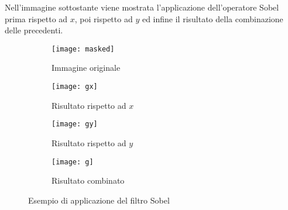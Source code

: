 Nell'immagine sottostante viene mostrata l'applicazione dell'operatore Sobel prima rispetto ad $x$, poi rispetto ad $y$ ed infine il risultato della combinazione delle precedenti.


\begin{figure}[ht]
  \begin{center}
  \begin{subfigure}{.49\linewidth}
    \centering\texttt{[image: masked]}
    \caption{Immagine originale}
  \end{subfigure}
  \begin{subfigure}{.49\linewidth}
    \centering\texttt{[image: gx]}
    \caption{Risultato rispetto ad $x$}
  \end{subfigure}
  \begin{subfigure}{.49\linewidth}
    \centering\texttt{[image: gy]}
    \caption{Risultato rispetto ad $y$}
  \end{subfigure}
  \begin{subfigure}{.49\linewidth}
    \centering\texttt{[image: g]}
    \caption{Risultato combinato}
  \end{subfigure}
  \end{center}
  \caption{Esempio di applicazione del filtro Sobel}
    \label{fig:sobel_example}
\end{figure}


\clearpage
